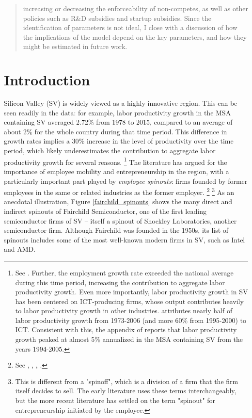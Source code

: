 \documentclass[12pt,english]{article}
\theoremstyle{remark}
\begin{document}
\begin{abstract}
increasing or decreasing the enforceability of non-competes, as well as other policies such as R\&D subsidies and startup subsidies. Since the identification of parameters is not ideal, I close with a discussion of how the implications of the model depend on the key parameters, and how they might be estimated in future work. 
	
\end{abstract}

\tableofcontents

\section{Introduction}


Silicon Valley (SV) is widely viewed as a highly innovative region. This can be seen readily in the data: for example, labor productivity growth in the MSA containing SV averaged 2.72\% from 1978 to 2015, compared to an average of about 2\% for the whole country during that time period. This difference in growth rates implies a 30\% increase in the level of productivity over the time period, which likely underestimates the contribution to aggregate labor productivity growth for several reasons. \footnote{See \cite{parilla_understanding_2017}. Further, the employment growth rate exceeded the national average during this time period, increasing the contribution to aggregate labor productivity growth. Even more importantly, labor productivity growth in SV has been centered on ICT-producing firms, whose output contributes heavily to labor productivity growth in other industries. \cite{jorgenson_retrospective_2008} attributes nearly half of labor productivity growth from 1973-2006 (and more 60\% from 1995-2000) to ICT. Consistent with this, the appendix of  \cite{parilla_understanding_2017} reports that labor productivity growth peaked at almost 5\% annualized in the MSA containing SV from the years 1994-2005.} The literature has argued for the importance of employee mobility and entrepreneurship in the region, with a particularly important part played by \textit{employee spinouts}: firms founded by former employees in the same or related industries as the former employer. \footnote{See \cite{saxenian_regional_1994}, \cite{gilson_legal_1999}, \cite{fallick_job-hopping_2006}, \cite{franco_covenants_2008}.} \footnote{This is different from a "spinoff", which is a division of a firm that the firm itself decides to sell. The early literature uses these terms interchangeably, but the more recent literature has settled on the term "spinout" for entrepreneurship initiated by the employee.} As an anecdotal illustration, Figure \ref{fairchild_spinouts} shows the many direct and indirect spinouts of Fairchild Semiconductor, one of the first leading semiconductor firms of SV -- itself a spinout of Shockley Laboratories, another semiconductor firm. Although Fairchild was founded in the 1950s, its list of spinouts includes some of the most well-known modern firms in SV, such as Intel and AMD. 
\end{document}
